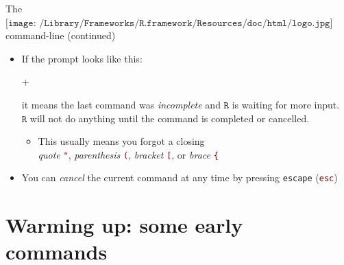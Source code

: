 \documentclass[
  11pt,
  ignorenonframetext,
]{beamer}
\newenvironment{Shaded}{\begin{snugshade}}{\end{snugshade}}
\newcommand{\NormalTok}[1]{#1}
\newcommand{\StringTok}[1]{\textcolor[rgb]{0.31,0.60,0.02}{#1}}
\providecommand{\tightlist}{%
  \setlength{\itemsep}{0pt}\setlength{\parskip}{0pt}}
\newcommand{\R}{\texttt{R}}
\newcommand{\highlight}[1]{\StringTok{#1}}
\newcommand{\important}[1]{\textcolor{darkred}{#1}}
\begin{document}
\begin{frame}{The
\(\texttt{[image: /Library/Frameworks/R.framework/Resources/doc/html/logo.jpg]}\)
command-line (continued)}
\protect\hypertarget{the-includegraphicsheight1emlibraryframeworksr.frameworkresourcesdochtmllogo.jpg-command-line-continued}{}
\begin{itemize}
\item
  If the prompt looks like this:

\begin{Shaded}
\begin{Highlighting}[]
\NormalTok{+}
\end{Highlighting}
\end{Shaded}

  it means the last command was \emph{incomplete} and \(\R\) is waiting
  for more input.\\
  \(\R\) will not do anything until the command is completed or
  cancelled.

  \begin{itemize}
  \tightlist
  \item
    This usually means you forgot a closing\\
    \emph{quote} \important{\texttt{"}}, \emph{parenthesis}
    \important{\texttt{(}}, \emph{bracket} \important{\texttt{[}}, or
    \emph{brace} \important{\texttt{\{}}
  \end{itemize}
\item
  \highlight{You can \textit{cancel} the current command at any time by pressing \texttt{escape}}
  (\important{\texttt{esc}})
\end{itemize}
\end{frame}

\hypertarget{warming-up-some-early-commands}{%
\section{Warming up: some early
commands}\label{warming-up-some-early-commands}}
\end{document}
